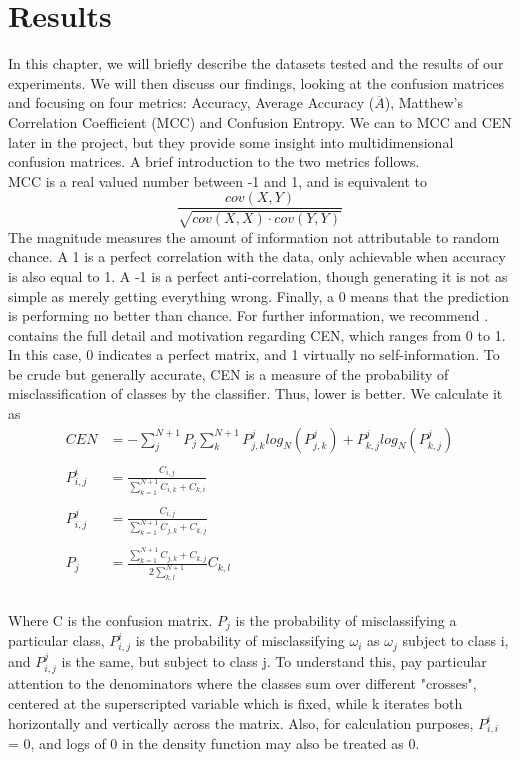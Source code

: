 \chapter{Results}\label{ch:results}
In this chapter, we will briefly describe the datasets tested and the results of our experiments.  We will then discuss our findings, looking at the confusion matrices and focusing on four metrics: Accuracy, Average Accuracy ($\overline{A}$), Matthew's Correlation Coefficient (MCC) and Confusion Entropy.  We can to MCC and CEN later in the project, but they provide some insight into multidimensional confusion matrices.  A brief introduction to the two metrics follows.\\
MCC is a real valued number between -1 and 1, and is equivalent to $$\frac{cov(X,Y)}{\sqrt{cov(X,X)\cdot cov(Y,Y)}}$$
The magnitude measures the amount of information not attributable to random chance.  A 1 is a perfect correlation with the data, only achievable when accuracy is also equal to 1.  A -1 is a perfect anti-correlation, though generating it is not as simple as merely getting everything wrong.  Finally, a 0 means that the prediction is performing no better than chance.  For further information, we recommend \cite{jurman_comparison_2012}.\\
\cite{wei_novel_2010} contains the full detail and motivation regarding CEN, which ranges from 0 to 1.  In this case, 0 indicates a perfect matrix, and 1 virtually no self-information.  To be crude but generally accurate, CEN is a measure of the probability of misclassification of classes by the classifier.  Thus, lower is better. We calculate it as\\
 \begin{align*}
CEN &= - \sum_{j}^{N+1}P_j\sum_{k}^{N+1}P^j_{j,k}log_N(P^j_{j,k}) + P^j_{k,j}log_N(P^j_{k,j})\\
\\
P^i_{i,j}&=\frac{C_{i,j}}{\sum_{k=1}^{N+1}C_{i,k} + C_{k,i}}\\
\\
P^j_{i,j}&=\frac{C_{i,j}}{\sum_{k=1}^{N+1}C_{j,k} + C_{k,j}}\\
\\
P_j&= \frac{\sum_{k=1}^{N+1}C_{j,k}+ C_{k,j}}{2\sum_{k,l}^{N+1}}C_{k,l}\\	
\end{align*}	\\Where C is the confusion matrix.  $P_j$ is the probability of misclassifying a particular class, $P^i_{i,j}$ is the probability of misclassifying $\omega_i$ as $\omega_j$ subject to class i, and $P^j_{i,j}$ is the same, but subject to class j.  To understand this, pay particular attention to the denominators where the classes sum over different "crosses", centered at the superscripted variable which is fixed, while k iterates both horizontally and vertically across the matrix.  Also, for calculation purposes, $P^i_{i,i}$ = 0, and logs of 0 in the density function may also be treated as 0.  
